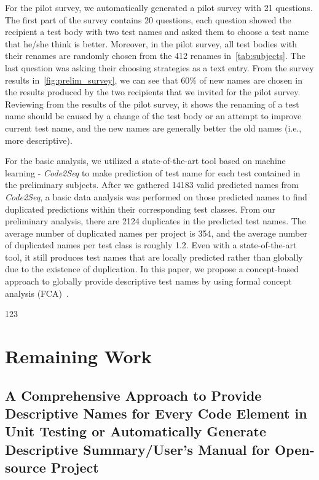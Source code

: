 \documentclass{article}
\begin{document}
For the pilot survey, we automatically generated a pilot survey with 21 questions.
%
The first part of the survey contains 20 questions, each question showed the recipient a test body with two test names and asked them to choose a test name that he/she think is better.
%
Moreover, in the pilot survey, all test bodies with their renames are randomly chosen from the \num{412} renames in~\cref{tab:subjects}.
%
The last question was asking their choosing strategies as a text entry.
%
From the survey results in~\cref{fig:prelim_survey}, we can see that \num{60}\% of new names are chosen in the results produced by the two recipients that we invited for the pilot survey.
%
Reviewing from the results of the pilot survey, it shows the renaming of a test name should be caused by a change of the test body or an attempt to improve current test name, and the new names are generally better the old names (i.e., more descriptive).


For the basic analysis, we utilized a state-of-the-art tool based on machine learning - \textit{Code2Seq} to make prediction of test name for each test contained in the preliminary subjects.
%
After we gathered \num{14183} valid predicted names from \textit{Code2Seq}, a basic data analysis was performed on those predicted names to find duplicated predictions within their corresponding test classes.
%
From our preliminary analysis, there are \num{2124} duplicates in the predicted test names.
%
The average number of duplicated names per project is \num{354}, and the average number of duplicated names per test class is roughly \num{1.2}.
%
Even with a state-of-the-art tool, it still produces test names that are locally predicted rather than globally due to the existence of duplication.
%
In this paper, we propose a concept-based approach to globally provide descriptive test names by using formal concept analysis (FCA)~\cite{tonella2004formal}.



123



\section{Remaining Work}

    
\subsection{A Comprehensive Approach to Provide Descriptive Names for Every Code Element in Unit Testing or Automatically Generate Descriptive Summary\slash User's Manual for Open-source Project}
\end{document}
